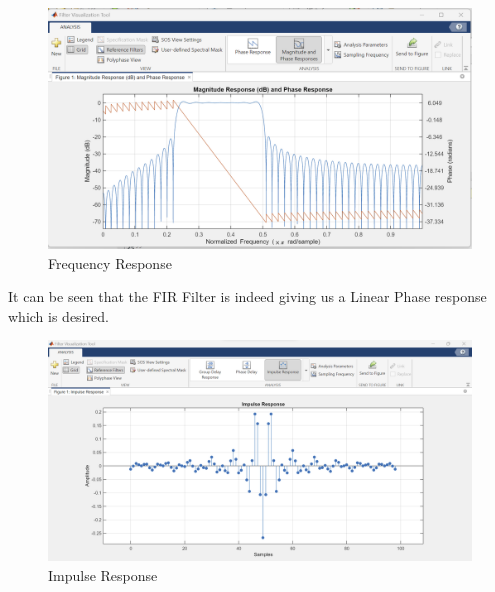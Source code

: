 \documentclass{article}
\begin{document}
\begin{figure}[h!]

\centering
\includegraphics[scale = 0.6]{Bode.png}
\caption{Frequency Response}
\end{figure}

It can be seen that the FIR Filter is indeed giving us a Linear Phase response which is
desired.

\clearpage

\begin{figure}[h!]

\centering
\includegraphics[scale = 0.45]{Impulse res.png}
\caption{Impulse Response}
\end{figure}
\end{document}
